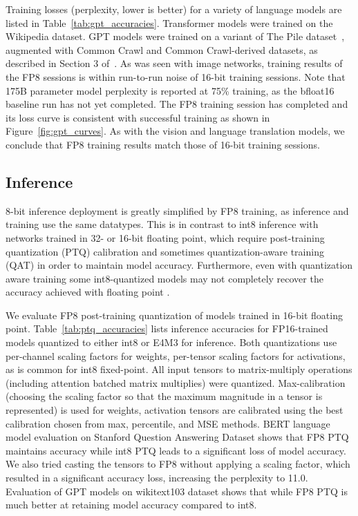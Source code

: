 Training losses (perplexity, lower is better) for a variety of language models are listed in Table~\ref{tab:gpt_accuracies}. Transformer models were trained on the Wikipedia dataset. GPT models were trained on a variant of The Pile dataset~\cite{pile_2020}, augmented with Common Crawl and Common Crawl-derived datasets, as described in Section 3 of~\cite{megatron_2022}. As was seen with image networks, training results of the FP8 sessions is within run-to-run noise of 16-bit training sessions. Note that 175B parameter model perplexity is reported at 75\% training, as the bfloat16 baseline run has not yet completed. The FP8 training session has completed and its loss curve is consistent with successful training as shown in Figure~\ref{fig:gpt_curves}. As with the vision and language translation models, we conclude that FP8 training results match those of 16-bit training sessions.

\subsection{Inference}
8-bit inference deployment is greatly simplified by FP8 training, as inference and training use the same datatypes. This is in contrast to int8 inference with networks trained in 32- or 16-bit floating point, which require post-training quantization (PTQ) calibration and sometimes quantization-aware training (QAT) in order to maintain model accuracy. Furthermore, even with quantization aware training some int8-quantized models may not completely recover the accuracy achieved with floating point \cite{fb_int8_accel}.

We evaluate FP8 post-training quantization of models trained in 16-bit floating point. Table~\ref{tab:ptq_accuracies} lists inference accuracies for FP16-trained models quantized to either int8 or E4M3 for inference. Both quantizations use per-channel scaling factors for weights, per-tensor scaling factors for activations, as is common for int8 fixed-point. All input tensors to matrix-multiply operations (including attention batched matrix multiplies) were quantized. Max-calibration (choosing the scaling factor so that the maximum magnitude in a tensor is represented) is used for weights, activation tensors are calibrated using the best calibration chosen from max, percentile, and MSE methods. BERT language model evaluation on Stanford Question Answering Dataset shows that FP8 PTQ maintains accuracy while int8 PTQ leads to a significant loss of model accuracy. We also tried casting the tensors to FP8 without applying a scaling factor, which resulted in a significant accuracy loss, increasing the perplexity to 11.0. Evaluation of GPT models on wikitext103 dataset shows that while FP8 PTQ is much better at retaining model accuracy compared to int8.

